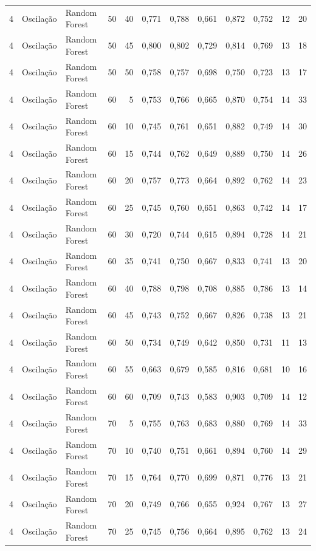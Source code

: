 \begin{longtable}{@{}rllrrrrrrrrr@{}}
4 & Oscilação & Random Forest & 50 & 40 & 0,771 & 0,788 & 0,661 & 0,872 & 0,752 & 12 & 20 \\
4 & Oscilação & Random Forest & 50 & 45 & 0,800 & 0,802 & 0,729 & 0,814 & 0,769 & 13 & 18 \\
4 & Oscilação & Random Forest & 50 & 50 & 0,758 & 0,757 & 0,698 & 0,750 & 0,723 & 13 & 17 \\
4 & Oscilação & Random Forest & 60 & 5 & 0,753 & 0,766 & 0,665 & 0,870 & 0,754 & 14 & 33 \\
4 & Oscilação & Random Forest & 60 & 10 & 0,745 & 0,761 & 0,651 & 0,882 & 0,749 & 14 & 30 \\
4 & Oscilação & Random Forest & 60 & 15 & 0,744 & 0,762 & 0,649 & 0,889 & 0,750 & 14 & 26 \\
4 & Oscilação & Random Forest & 60 & 20 & 0,757 & 0,773 & 0,664 & 0,892 & 0,762 & 14 & 23 \\
4 & Oscilação & Random Forest & 60 & 25 & 0,745 & 0,760 & 0,651 & 0,863 & 0,742 & 14 & 17 \\
4 & Oscilação & Random Forest & 60 & 30 & 0,720 & 0,744 & 0,615 & 0,894 & 0,728 & 14 & 21 \\
4 & Oscilação & Random Forest & 60 & 35 & 0,741 & 0,750 & 0,667 & 0,833 & 0,741 & 13 & 20 \\
4 & Oscilação & Random Forest & 60 & 40 & 0,788 & 0,798 & 0,708 & 0,885 & 0,786 & 13 & 14 \\
4 & Oscilação & Random Forest & 60 & 45 & 0,743 & 0,752 & 0,667 & 0,826 & 0,738 & 13 & 21 \\
4 & Oscilação & Random Forest & 60 & 50 & 0,734 & 0,749 & 0,642 & 0,850 & 0,731 & 11 & 13 \\
4 & Oscilação & Random Forest & 60 & 55 & 0,663 & 0,679 & 0,585 & 0,816 & 0,681 & 10 & 16 \\
4 & Oscilação & Random Forest & 60 & 60 & 0,709 & 0,743 & 0,583 & 0,903 & 0,709 & 14 & 12 \\
4 & Oscilação & Random Forest & 70 & 5 & 0,755 & 0,763 & 0,683 & 0,880 & 0,769 & 14 & 33 \\
4 & Oscilação & Random Forest & 70 & 10 & 0,740 & 0,751 & 0,661 & 0,894 & 0,760 & 14 & 29 \\
4 & Oscilação & Random Forest & 70 & 15 & 0,764 & 0,770 & 0,699 & 0,871 & 0,776 & 13 & 21 \\
4 & Oscilação & Random Forest & 70 & 20 & 0,749 & 0,766 & 0,655 & 0,924 & 0,767 & 13 & 27 \\
4 & Oscilação & Random Forest & 70 & 25 & 0,745 & 0,756 & 0,664 & 0,895 & 0,762 & 13 & 24 \\

\end{longtable}
